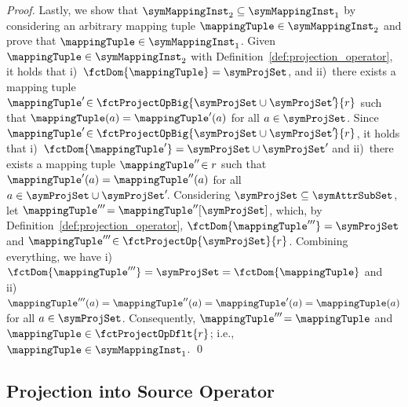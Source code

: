 \begin{proof}
    Lastly, we show that $\symMappingInst_2 \subseteq \symMappingInst_1$ by 
    considering an arbitrary mapping tuple $\mappingTuple \in \symMappingInst_2$ and prove that $\mappingTuple \in \symMappingInst_1$. 
    Given $\mappingTuple \in \symMappingInst_2$ with Definition~\ref{def:projection_operator}, it holds 
    that i)~$\fctDom{\mappingTuple} =  \symProjSet$, and ii)~there exists a mapping
    tuple $\mappingTuple'\! \in \fctProjectOpBig{\symProjSet \cup \symProjSet'\!}{r}$ such 
    that $\mappingTuple(a) = \mappingTuple'(a)$ for all $a \in \symProjSet$.
    Since $\mappingTuple'\! \in \fctProjectOpBig{\symProjSet \cup \symProjSet'\!}{r}$, 
    it holds that i)~$\fctDom{\mappingTuple'} = \symProjSet \cup \symProjSet'\!$ and 
    ii)~there exists a mapping tuple $\mappingTuple''\! \in r$ such that 
    $\mappingTuple'(a) = \mappingTuple''(a)$ for all $a \in \symProjSet \cup \symProjSet'\!$. 
    Considering $\symProjSet \subseteq \symAttrSubSet$, let 
    $\mappingTuple'''\! = \mappingTuple''[\symProjSet]$, which, by Definition~\ref{def:projection_operator}, 
    $\fctDom{\mappingTuple'''} = \symProjSet$ and $\mappingTuple'''\! \in \fctProjectOp{\symProjSet}{r}$. 
    Combining everything, we have i)~$\fctDom{\mappingTuple'''} = \symProjSet = \fctDom{\mappingTuple}$ and 
    ii)~$\mappingTuple'''(a) = \mappingTuple''(a) = \mappingTuple'(a) = \mappingTuple(a)$ for all $a \in \symProjSet$. 
    Consequently, $\mappingTuple'''\! = \mappingTuple$ and $\mappingTuple \in \fctProjectOpDflt{r}$; 
    i.e., $\mappingTuple \in \symMappingInst_1$.
    \qed
\end{proof}



\subsection{Projection into Source Operator}%
\label{proof:projection_into_source_operator}

